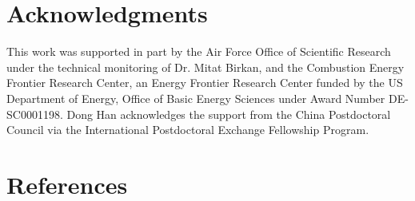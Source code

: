 \documentclass[review,3p,times]{elsarticle}
\begin{document}
\section*{Acknowledgments}

This work was supported in part by the Air Force Office of Scientific Research under the technical monitoring of Dr. Mitat Birkan, and the Combustion Energy Frontier Research Center, an Energy Frontier Research Center funded by the US Department of Energy, Office of Basic Energy Sciences under Award Number DE-SC0001198. Dong Han acknowledges the support from the China Postdoctoral Council via the International Postdoctoral Exchange Fellowship Program.


\section*{References}



\renewcommand{\thefigure}{\arabic{figure}}
\renewcommand{\thetable}{\arabic{table}}

\clearpage
\end{document}
